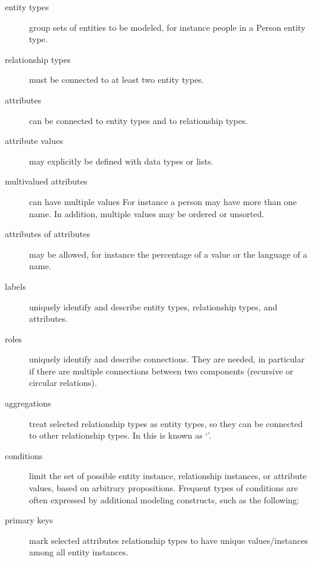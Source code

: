 
\label{ermconceptualconstructs}
\begin{description}

\item[entity types] group sets of entities to be modeled, for
  instance people in a {\ormtext Person} entity type.

\item[relationship types] must be connected to at least two 
  entity types.

\item[attributes] can be connected to entity types and to 
  relationship types. 

\item[attribute values] may explicitly be defined with data types or lists.

\item[multivalued attributes] can have multiple values 
  For instance a person may have more than one name. In addition,
  multiple values may be ordered or unsorted.

\item[attributes of attributes] may be allowed, for instance the
  percentage of a value or the language of a name.

\item[labels] uniquely identify and describe entity types, 
  relationship types, and attributes.

\item[roles] uniquely identify and describe connections. They
  are needed, in particular if there are multiple connections between
  two components (recursive or circular relations). %

\item[aggregations] treat selected relationship types as 
  entity types, so they can be connected to other relationship types.
  In  this is known as `'.

\item[conditions] limit the set of possible entity instance, 
  relationship instances, or attribute values, based on arbitrary 
  propositions. Frequent types of conditions are often expressed by 
  additional modeling constructs, such as the following:

\item[primary keys] mark selected attributes relationship types to have
  unique values/instances among all entity instances.


\end{description}
